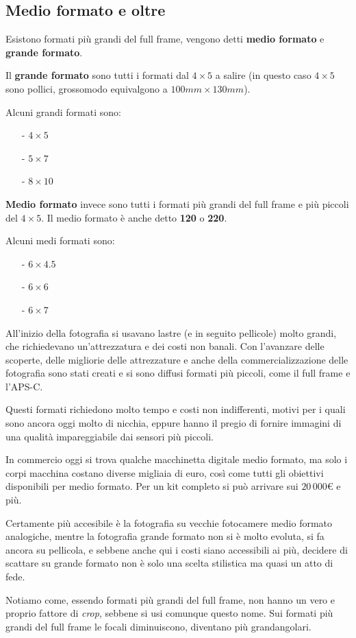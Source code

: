 \subsection{Medio formato e oltre} \label{subsec:sensorimedioformato}
Esistono formati più grandi del full frame, vengono detti \textbf{medio formato} e \textbf{grande formato}.

Il \textbf{grande formato} sono tutti i formati dal $4 \times 5$ a salire (in questo caso $4 \times 5$ sono pollici, grossomodo equivalgono a $100mm \times 130mm$).

Alcuni grandi formati sono:
\begin{itemize}
    \item[-] $4 \times 5$
    \item[-] $5 \times 7$
    \item[-] $8 \times 10$
\end{itemize}

\textbf{Medio formato} invece sono tutti i formati più grandi del full frame e più piccoli del $4 \times 5$. Il medio formato è anche detto \textbf{120} o \textbf{220}.

Alcuni medi formati sono:
\begin{itemize}
    \item[-] $6 \times 4.5$
    \item[-] $6 \times 6$
    \item[-] $6 \times 7$
\end{itemize}

All'inizio della fotografia si usavano lastre (e in seguito pellicole) molto grandi, che richiedevano un'attrezzatura e dei costi non banali. Con l'avanzare delle scoperte, delle migliorie delle attrezzature e anche della commercializzazione delle fotografia sono stati creati e si sono diffusi formati più piccoli, come il full frame e l'APS-C.

Questi formati richiedono molto tempo e costi non indifferenti, motivi per i quali sono ancora oggi molto di nicchia, eppure hanno il pregio di fornire immagini di una qualità impareggiabile dai sensori più piccoli.

In commercio oggi si trova qualche macchinetta digitale medio formato, ma solo i corpi macchina costano diverse migliaia di euro, così come tutti gli obiettivi disponibili per medio formato. Per un kit completo si può arrivare sui $20\,000 \euro{}$ e più.

Certamente più accesibile è la fotografia su vecchie fotocamere medio formato analogiche, mentre la fotografia grande formato non si è molto evoluta, si fa ancora su pellicola, e sebbene anche qui i costi siano accessibili ai più, decidere di scattare su grande formato non è solo una scelta stilistica ma quasi un atto di fede.

Notiamo come, essendo formati più grandi del full frame, non hanno un vero e proprio fattore di \textit{crop}, sebbene si usi comunque questo nome. Sui formati più grandi del full frame le focali diminuiscono, diventano più grandangolari.